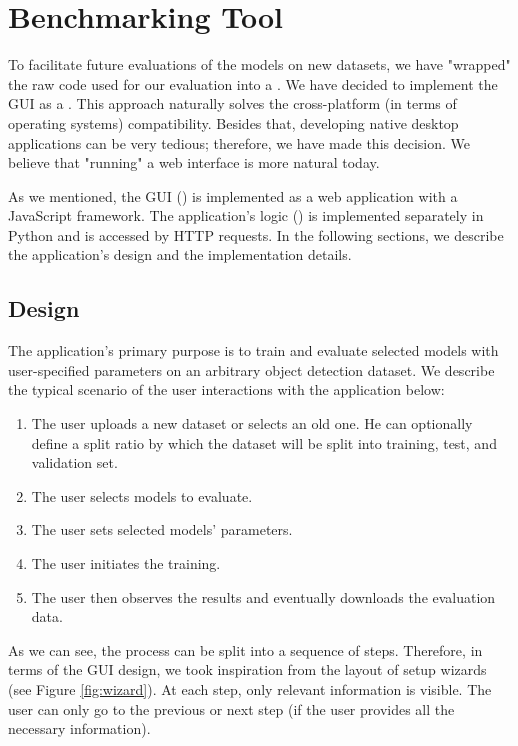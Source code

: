\chapter{Benchmarking Tool}\label{chap:tool}
To facilitate future evaluations of the models on new datasets, we have
"wrapped" the raw code used for our evaluation into a . We have decided to implement the GUI as a
. This approach naturally solves the cross-platform (in
terms of operating systems) compatibility. Besides that, developing native
desktop applications can be very tedious; therefore, we have made this decision.
We believe that "running" a web interface is more natural today.

As we mentioned, the GUI () is implemented as a web application
with a JavaScript framework. The application's logic () is
implemented separately in Python and is accessed by HTTP requests. In the
following sections, we describe the application's design and the implementation
details.

\section{Design}
The application's primary purpose is to train and evaluate selected models with
user-specified parameters on an arbitrary object detection dataset. We describe
the typical scenario of the user interactions with the application below:
\renewcommand{\theenumi}{\arabic{enumi}}
\begin{enumerate}
    \item The user uploads a new dataset or selects an old one. He can
          optionally define a split ratio by which the dataset will be split
          into training, test, and validation set.
    \item The user selects models to evaluate.
    \item The user sets selected models' parameters.
    \item The user initiates the training.
    \item The user then observes the results and eventually downloads the
          evaluation data.
\end{enumerate}
As we can see, the process can be split into a sequence of steps. Therefore, in
terms of the GUI design, we took inspiration from the layout of setup wizards
(see Figure \ref{fig:wizard}). At each step, only relevant information is
visible. The user can only go to the previous or next step (if the user provides
all the necessary information).

